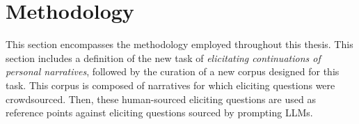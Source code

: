 \chapter{Methodology}
\label{cha:methodology}
This section encompasses the methodology employed throughout this thesis. 
This section includes a definition of the new task of \emph{elicitating continuations of personal narratives}, followed by the curation of a new corpus designed for this task. This corpus is composed of narratives for which eliciting questions were crowdsourced. Then, these human-sourced eliciting questions are used as reference points against eliciting questions sourced by prompting LLMs.
